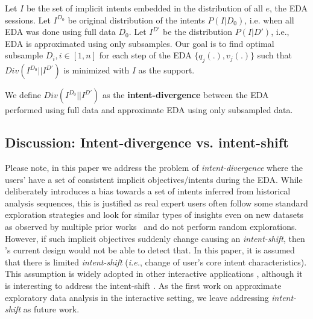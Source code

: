 Let $I$ be the set of implicit intents embedded in the distribution of all $e$, the EDA sessions.
%
Let $I^{D_0}$ be original distribution of the intents $P(I|D_0)$, i.e. when all EDA was done using full data $D_0$.
Let $I^{D'}$ be the distribution $P(I|D')$, i.e., EDA is approximated using only subsamples.
Our goal is to find optimal subsample $D_i, i \in [1,n]$ for each step of the EDA $\{q_j(.), v_j(.)\}$ such that $Div(I^{D_0}||I^{D'})$ is minimized with $I$ as the support.
%

We define $Div(I^{D_0}||I^{D'})$ as the \textbf{intent-divergence} between the EDA performed using full data and approximate EDA using only subsampled data. 

\subsection{Discussion: Intent-divergence vs. intent-shift}
\label{app:discussion_intent_shift}

Please note, in this paper we address the problem of \textit{intent-divergence} where the users' have a set of consistent implicit objectives/intents during the EDA. 
While \name{} deliberately introduces a bias towards a set of intents inferred from historical analysis sequences, this is justified as real expert users often follow some standard exploration strategies and look for similar types of insights even on new datasets as observed by multiple prior works~\cite{atena2020sigmod, jain2016sqlshare, milo2018next} and do not perform random explorations.
However, if such implicit objectives suddenly change causing an \textit{intent-shift}, then \name{}'s current design would not be able to detect that. 
In this paper, it is assumed that there is limited \textit{intent-shift} (\emph{i.e.}, change of user's core intent characteristics). 
This assumption is widely adopted in other interactive applications \cite{liu2018dialogue,guo2018dialog,tan2019drill}, although it is interesting to address the intent-shift \cite{xie2021tiage,arnold2019sector}. As the first work on approximate exploratory data analysis in the interactive setting, we leave addressing \textit{intent-shift} as future work.


